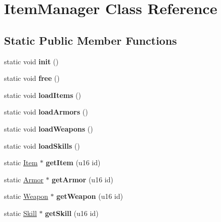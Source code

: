 \hypertarget{classItemManager}{\section{Item\-Manager Class Reference}
\label{classItemManager}
}
\subsection*{Static Public Member Functions}
\begin{DoxyCompactItemize}
\item 
\hypertarget{classItemManager_a12505eac7fd10a75b1a97ffa7a94468d}{static void {\bfseries init} ()}\label{classItemManager_a12505eac7fd10a75b1a97ffa7a94468d}

\item 
\hypertarget{classItemManager_abd04dfc2ad6abaf81d370f3a93ed2c0d}{static void {\bfseries free} ()}\label{classItemManager_abd04dfc2ad6abaf81d370f3a93ed2c0d}

\item 
\hypertarget{classItemManager_a5dd0f6c4f9b3bf092a958860e1b1e263}{static void {\bfseries load\-Items} ()}\label{classItemManager_a5dd0f6c4f9b3bf092a958860e1b1e263}

\item 
\hypertarget{classItemManager_ac754573383777a828934a947c9321c4b}{static void {\bfseries load\-Armors} ()}\label{classItemManager_ac754573383777a828934a947c9321c4b}

\item 
\hypertarget{classItemManager_a72677ec67e913ce5787f93d7ed3a71e7}{static void {\bfseries load\-Weapons} ()}\label{classItemManager_a72677ec67e913ce5787f93d7ed3a71e7}

\item 
\hypertarget{classItemManager_a52242480e51b5832cbd629aa34bae4c8}{static void {\bfseries load\-Skills} ()}\label{classItemManager_a52242480e51b5832cbd629aa34bae4c8}

\item 
\hypertarget{classItemManager_a5c9224fc3657a2202a91c4e3b195afea}{static \hyperlink{classItem}{Item} $\ast$ {\bfseries get\-Item} (u16 id)}\label{classItemManager_a5c9224fc3657a2202a91c4e3b195afea}

\item 
\hypertarget{classItemManager_a075f63e61a236fe7fbb806c2c50c53e9}{static \hyperlink{classArmor}{Armor} $\ast$ {\bfseries get\-Armor} (u16 id)}\label{classItemManager_a075f63e61a236fe7fbb806c2c50c53e9}

\item 
\hypertarget{classItemManager_a3be27a37c758c0bc2fcfa662571bfabc}{static \hyperlink{classWeapon}{Weapon} $\ast$ {\bfseries get\-Weapon} (u16 id)}\label{classItemManager_a3be27a37c758c0bc2fcfa662571bfabc}

\item 
\hypertarget{classItemManager_a712fe562ca6ee14ceda5a90eb58c873f}{static \hyperlink{classSkill}{Skill} $\ast$ {\bfseries get\-Skill} (u16 id)}\label{classItemManager_a712fe562ca6ee14ceda5a90eb58c873f}

\end{DoxyCompactItemize}
